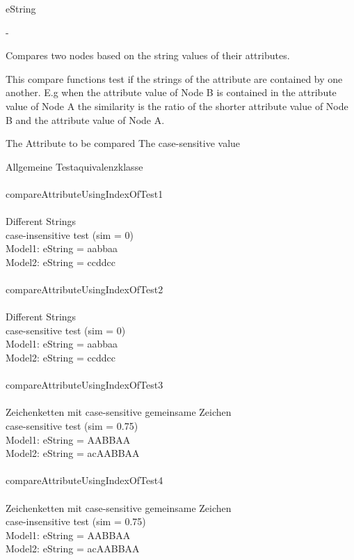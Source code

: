 
\allowedtypes
eString

\precondition
-

\semantics
Compares two nodes based on the string values of their attributes.

\returnvalue
This compare functions test if the strings of the attribute are contained by
one another. E.g when the attribute value of Node B is contained in the
attribute value of Node A the similarity is the ratio of the shorter attribute
value of Node B and the attribute value of Node A.

\parameters
The Attribute to be compared 
The case-sensitive value


\exceptions


\test	
Allgemeine Testaquivalenzklasse \\\\

compareAttributeUsingIndexOfTest1\\\\
Different Strings\\
case-insensitive test (sim = 0)\\
Model1: eString = aabbaa\\
Model2: eString = ccddcc\\\\

compareAttributeUsingIndexOfTest2\\\\
Different Strings\\
case-sensitive test (sim = 0)\\
Model1: eString = aabbaa\\
Model2: eString = ccddcc\\\\

compareAttributeUsingIndexOfTest3\\\\
Zeichenketten mit case-sensitive gemeinsame Zeichen\\
case-sensitive test (sim = 0.75)\\
Model1: eString = AABBAA\\
Model2: eString = acAABBAA\\\\

compareAttributeUsingIndexOfTest4\\\\
Zeichenketten mit case-sensitive gemeinsame Zeichen\\
case-insensitive test (sim = 0.75)\\
Model1: eString = AABBAA\\
Model2: eString = acAABBAA\\\\

